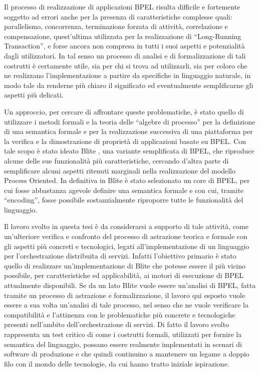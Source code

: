 Il processo di realizzazione di applicazioni BPEL risulta difficile e fortemente
soggetto ad errori anche per la presenza di caratteristiche complesse quali:
parallelismo, concorrenza, terminazione forzata di attività, correlazione e
compensazione, quest'ultima utilizzata per la realizzazione di ``Long-Running
Transaction'', e forse ancora non compresa in tutti i suoi aspetti e potenzialità
dagli utilizzatori. In tal senso un processo di analisi e di
formalizzazione di tali costrutti è certamente utile, sia per chi si trova ad
utilizzarli, sia per coloro che ne realizzano l'implementazione a partire da
specifiche in linguaggio naturale, in modo tale da renderne più chiaro il
significato ed eventualmente semplificarne gli aspetti più delicati.

Un approccio, per cercare di affrontare queste problematiche, è stato quello di
utilizzare i metodi formali e la teoria delle ``algebre di processo'' per la
definizione di una semantica formale e per la realizzazione successiva di una
piattaforma per la verifica e la dimostrazione di proprietà di applicazioni
basate su BPEL. Con tale scopo è stato ideato Blite \cite{LaPuTie1}, una
variante semplificata di BPEL, che riproduce alcune delle sue funzionalità più
caratteristiche, cercando d'altra parte di semplificare alcuni aspetti ritenuti
marginali nella realizzazione del modello Process Oriented. In definitiva in
Blite è stato selezionato un core di BPEL, per cui fosse abbastanza agevole
definire una semantica formale e con cui, tramite ``encoding'', fosse possibile
sostanzialmente riproporre tutte le funzionalità del linguaggio.

Il lavoro svolto in questa tesi è da considerarsi a supporto di tale attività,
come un'ulteriore verifica e confronto del processo di astrazione teorica e
formale con gli aspetti più concreti e tecnologici, legati all'implementazione di
un linguaggio per l'orchestrazione distribuita di servizi. Infatti l'obiettivo
primario è stato quello di realizzare un'implementazione di Blite che potesse
essere il più vicino possibile, per caratteristiche ed applicabilità, ai motori
di esecuzione di BPEL attualmente disponibili. Se da un lato Blite vuole essere
un'analisi di BPEL, fatta tramite un processo di astrazione e formalizzazione,
il lavoro qui esposto vuole essere a sua volta un'analisi di tale processo, nel
senso che ne vuole verificare la compatibilità e l'attinenza con le problematiche
più concrete e tecnologiche presenti nell'ambito dell'orchestrazione di servizi.
Di fatto il lavoro svolto rappresenta un test critico di come i costrutti
formali, utilizzati per fornire la semantica del linguaggio, possano essere realmente
implementati in scenari di software di produzione e che quindi continuino a
mantenere un legame a doppio filo con il mondo delle tecnologie, da cui hanno
tratto iniziale ispirazione. 

